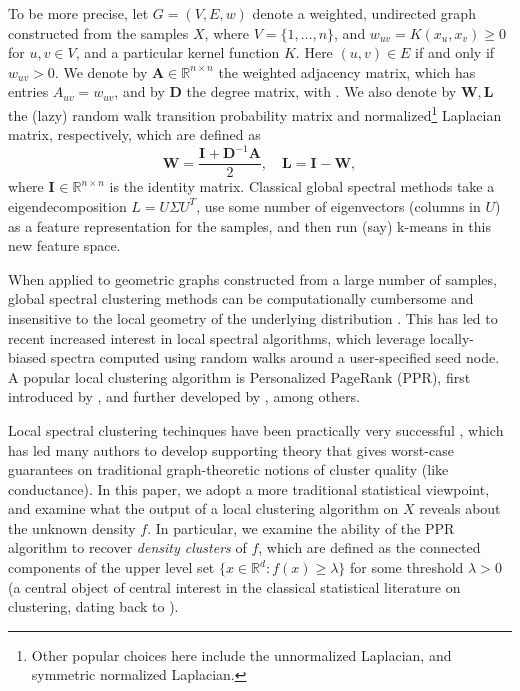 \documentclass{article}
\newcommand{\Reals}{\mathbb{R}}
\newcommand{\Rd}{\Reals^d}
\newcommand{\1}{\mathbf{1}}
\newcommand{\Abf}{\mathbf{A}}
\newcommand{\Xbf}{X}             %
\newcommand{\Wbf}{\mathbf{W}}
\newcommand{\Lbf}{\mathbf{L}}
\newcommand{\Dbf}{\mathbf{D}}
\newcommand{\Ibf}[1]{\mathbf{I}_{#1}}
\theoremstyle{aldenthm}
\theoremstyle{aldenrmrk}
\begin{document}
To be more precise, let $G=(V,E,w)$ denote a weighted, undirected graph  
constructed from the samples $\Xbf$, where $V=\{1,\ldots,n\}$, and $w_{uv}
= K(x_u,x_v) \geq 0$ for $u,v \in V$, and a particular kernel function $K$.
Here $(u,v) \in E$ if and only if $w_{uv} > 0$.  We denote by $\Abf \in
\Reals^{n \times n}$ the weighted adjacency matrix, which has entries
$A_{uv}=w_{uv}$, and by $\Dbf$ the degree matrix, with 
\smash{$\Dbf_{uu} = \sum_{v \in V} \Abf_{uv}$}.  We also denote by $\Wbf,\Lbf$
the (lazy) random walk transition probability matrix and normalized\footnote{Other
  popular choices here include the unnormalized Laplacian, and symmetric
  normalized Laplacian.} 
Laplacian matrix, respectively, which are defined as
$$
\Wbf = \frac{\Ibf{} + \Dbf^{-1}\Abf}{2}, \quad \Lbf = \Ibf{} - \Wbf,
$$
where $\Ibf{} \in \Reals^{n\times n}$ is the identity matrix.  Classical global
spectral methods take a eigendecomposition $L=U \Sigma U^T$, use some 
number of eigenvectors (columns in $U$) as a feature representation for the
samples, and then run (say) k-means in this new feature space.

When applied to geometric graphs constructed from a large number of samples,
global spectral clustering methods can be computationally cumbersome and   
insensitive to the local geometry of the underlying distribution
\citep{leskovec2010,mahoney2012}.  This has led to recent increased interest in
local spectral algorithms, which leverage locally-biased spectra computed using
random walks around a user-specified seed node.  A popular local clustering
algorithm is Personalized PageRank (PPR), first introduced by
\citep{haveliwala2003}, and further developed by
\citep{spielman2011,spielman2014,andersen2006,mahoney2012,zhu2013},
among others.  

Local spectral clustering techinques have been practically very successful
\citep{leskovec2010,andersen2012,gleich2012,mahoney2012,wu2012}, which has led
many authors to develop supporting theory
\citep{spielman2013,andersen2009,gharan2012,zhu2013} that gives worst-case
guarantees on traditional graph-theoretic notions of cluster quality (like
conductance).  In this paper, we adopt a more traditional statistical viewpoint,
and examine what the output of a local clustering algorithm on $\Xbf$ reveals
about the unknown density $f$.  In particular, we examine the ability of the PPR
algorithm to recover \emph{density clusters} of $f$, which are defined as the
connected components of the upper level set $\{x \in \Rd : f(x) \geq \lambda\}$
for some threshold $\lambda > 0$ (a central object of central interest in the
classical statistical literature on clustering, dating back to
\citet{hartigan1981}).
\end{document}
